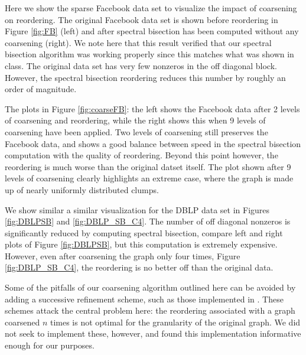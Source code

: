 \documentclass[11pt]{article}
\begin{document}
Here we show the sparse Facebook data set to visualize the impact of coarsening
on reordering. The original Facebook data set is shown before reordering in Figure
\ref{fig:FB} (left) and after spectral bisection has been computed without any
coarsening (right). We note here that this result verified that our spectral
bisection algorithm was working properly since this matches what was shown in
class. The original data set has very few nonzeros in the off diagonal block.
However, the spectral bisection reordering reduces this number by roughly an
order of magnitude. 

The plots in Figure \ref{fig:coarseFB}: the left shows the Facebook data after 2
levels of coarsening and reordering, while the right shows this when 9 levels of
coarsening have been applied. Two levels of coarsening still preserves the
Facebook data, and shows a good balance between speed in the spectral bisection
computation with the quality of reordering. Beyond this point however, the
reordering is much worse than the original datset itself. The plot shown after 9
levels of coarsening clearly highlights an extreme case, where the graph is made
up of nearly uniformly distributed clumps.

We show similar a similar visualization for the DBLP data set in Figures
\ref{fig:DBLPSB} and \ref{fig:DBLP_SB_C4}. The number of off diagonal nonzeros
is significantly reduced by computing spectral bisection, compare left and right
plots of Figure \ref{fig:DBLPSB}, but this computation is extremely expensive.
However, even after coarsening the graph only four times, Figure
\ref{fig:DBLP_SB_C4}, the reordering is no better off than the original data.

Some of the pitfalls of our coarsening algorithm outlined here can be avoided by
adding a successive refinement scheme, such as those implemented in
\cite{multilevel}. These schemes attack the central problem here: the reordering
associated with a graph coarsened $n$ times is not optimal for the granularity
of the original graph. We did not seek to implement these, however, and found
this implementation informative enough for our purposes. 
\end{document}

